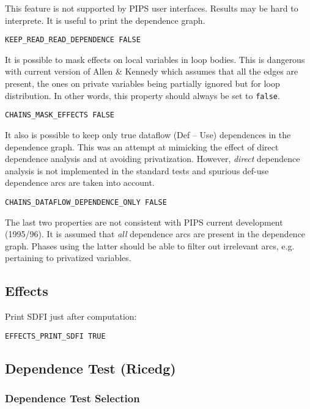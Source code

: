 This feature is not supported by PIPS user interfaces. Results may be
hard to interprete. It is useful to print the dependence graph.

\begin{verbatim}
KEEP_READ_READ_DEPENDENCE FALSE
\end{verbatim}

It is possible to mask effects on local variables in loop bodies. This
is dangerous with current version of Allen \& Kennedy which assumes that
all the edges are present, the ones on private variables being
partially ignored but for loop distribution. In other words, this
property should always be set to \verb+false+.

\begin{verbatim}
CHAINS_MASK_EFFECTS FALSE
\end{verbatim}

It also is possible to keep only true dataflow (Def -- Use) dependences in
the dependence graph. This was an attempt at mimicking the effect of
direct dependence analysis and at avoiding privatization. However, {\em
direct} dependence analysis is not implemented in the standard tests and
spurious def-use dependence arcs are taken into account.

\begin{verbatim}
CHAINS_DATAFLOW_DEPENDENCE_ONLY FALSE
\end{verbatim}

The last two properties are not consistent with PIPS current development
(1995/96). It is assumed that {\em all} dependence arcs are present in the
dependence graph. Phases using the latter should be able to filter out
irrelevant arcs, e.g. pertaining to privatized variables.

\subsection{Effects}

Print SDFI just after computation:

\begin{verbatim}
EFFECTS_PRINT_SDFI TRUE
\end{verbatim}


\subsection{Dependence Test (Ricedg)}


\subsubsection{Dependence Test Selection}

